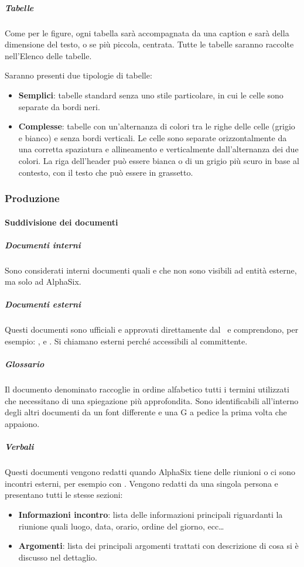 			\subparagraph{Tabelle}
			Come per le figure, ogni tabella sarà accompagnata da una caption e sarà della dimensione del testo, o se più piccola, centrata.
			Tutte le tabelle saranno raccolte nell'Elenco delle tabelle.\par
			Saranno presenti due tipologie di tabelle:
			\begin{itemize}
				\item \textbf{Semplici}: tabelle standard senza uno stile particolare, in cui le celle sono separate da bordi neri.
				\item \textbf{Complesse}: tabelle con un'alternanza di colori tra le righe delle celle (grigio e bianco) e senza bordi verticali.
					Le celle sono separate orizzontalmente da una corretta spaziatura e allineamento e verticalmente dall'alternanza dei due colori.
					La riga dell'header può essere bianca o di un grigio più scuro in base al contesto, con il testo che può essere in grassetto.
			\end{itemize}


		\subsubsection{Produzione}

			\paragraph{Suddivisione dei documenti}

			\subparagraph{Documenti interni}
			Sono considerati interni documenti quali  e  che non sono visibili ad entità esterne,
			ma solo ad AlphaSix.

			\subparagraph{Documenti esterni}
			Questi documenti sono ufficiali e approvati direttamente dal \Res\ e comprendono, per esempio: ,
			 e . Si chiamano esterni perché accessibili al committente.

			\subparagraph{Glossario}
			Il documento denominato  raccoglie in ordine alfabetico tutti i termini utilizzati che necessitano di una spiegazione più approfondita.
			Sono identificabili all'interno degli altri documenti da un font differente e una G a pedice la prima volta che appaiono.

			\subparagraph{Verbali}
			Questi documenti vengono redatti quando AlphaSix tiene delle riunioni o ci sono incontri esterni, per esempio con \II. Vengono redatti da una singola persona
			e presentano tutti le stesse sezioni:
			\begin{itemize}
				\item \textbf{Informazioni incontro}: lista delle informazioni principali riguardanti la riunione quali luogo, data, orario, ordine del giorno, ecc\dots
				\item \textbf{Argomenti}: lista dei principali argomenti trattati con descrizione di cosa si è discusso nel dettaglio.
			\end{itemize}


